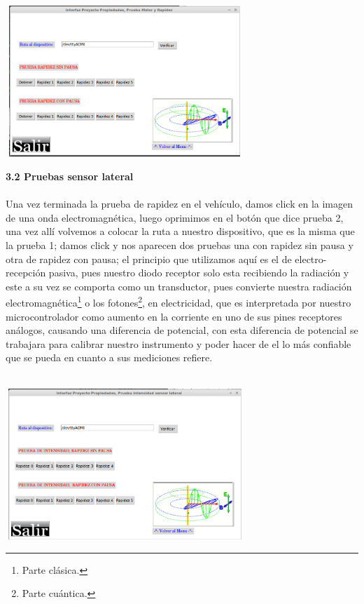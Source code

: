 \documentclass[12]{article}
\newenvironment{Figure}
{\par\medskip\noindent\minipage{\linewidth}}
{\endminipage\par\medskip}
\begin{document}
\begin{multicols}{2}
\begin{Figure}	
\center
\includegraphics[width=9cm, height=5.7cm]{img/prueba1.png} 
\label{fig:g10}
\end{Figure}
\vspace{0.6 cm}

{\bf{3.2 Pruebas sensor lateral}}\\\\
Una vez terminada la prueba de rapidez en el vehículo, damos click en la imagen de una onda electromagnética, luego oprimimos en el botón que dice prueba 2, una vez allí volvemos a colocar la ruta a nuestro dispositivo, que es la misma que la prueba 1; damos click y nos aparecen dos pruebas una con rapidez sin pausa y otra de rapidez con pausa; el principio que utilizamos aquí es el de electro-recepción pasiva\cite{CIRCUITOS}, pues nuestro diodo receptor\cite{INFRARED} solo esta recibiendo la radiación y este a su vez se comporta como un  transductor\cite{CIRCUITOS}, pues convierte nuestra radiación electromagnética\footnote{Parte clásica.} o los fotones\footnote{Parte cuántica.}, en electricidad, que es interpretada  por nuestro microcontrolador como aumento en la corriente en uno de sus pines receptores análogos,  causando una diferencia de potencial\cite{CIRCUITOS}, con esta diferencia de potencial se trabajara para calibrar nuestro instrumento y poder hacer de el lo más confiable que se pueda en cuanto a sus mediciones refiere.\\\\

\begin{Figure}	
\center
\includegraphics[width=9cm, height=5.7cm]{img/prueba2.png} 
\label{fig:g11}
\end{Figure}
\vspace{0.6 cm}


\end{multicols}
\end{document}
